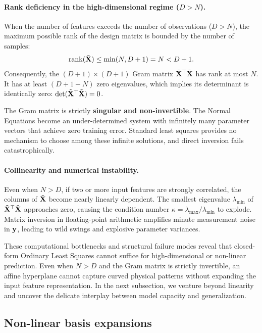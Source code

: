 \paragraph{Rank deficiency in the high-dimensional regime ($D > N$).}
When the number of features exceeds the number of observations ($D > N$), the maximum possible rank of the design matrix is bounded by the number of samples:
\begin{equation}
\operatorname{rank}(\tilde{\mathbf{X}}) \le \min(N, D+1) = N < D+1.
\label{eq:rank_deficiency}
\end{equation}
Consequently, the $(D+1) \times (D+1)$ Gram matrix $\tilde{\mathbf{X}}^\top \tilde{\mathbf{X}}$ has rank at most $N$. It has at least $(D+1 - N)$ zero eigenvalues, which implies its determinant is identically zero: $\det(\tilde{\mathbf{X}}^\top \tilde{\mathbf{X}}) = 0$. 

The Gram matrix is strictly \textbf{singular and non-invertible}. The Normal Equations become an under-determined system with infinitely many parameter vectors that achieve zero training error. Standard least squares provides no mechanism to choose among these infinite solutions, and direct inversion fails catastrophically.

\paragraph{Collinearity and numerical instability.}
Even when $N > D$, if two or more input features are strongly correlated, the columns of $\tilde{\mathbf{X}}$ become nearly linearly dependent. The smallest eigenvalue $\lambda_{\min}$ of $\tilde{\mathbf{X}}^\top \tilde{\mathbf{X}}$ approaches zero, causing the condition number $\kappa = \lambda_{\max}/\lambda_{\min}$ to explode. Matrix inversion in floating-point arithmetic amplifies minute measurement noise in $\mathbf{y}$, leading to wild swings and explosive parameter variances.

These computational bottlenecks and structural failure modes reveal that closed-form Ordinary Least Squares cannot suffice for high-dimensional or non-linear prediction. Even when $N > D$ and the Gram matrix is strictly invertible, an affine hyperplane cannot capture curved physical patterns without expanding the input feature representation. In the next subsection, we venture beyond linearity and uncover the delicate interplay between model capacity and generalization.

\subsection{Non-linear basis expansions}
\label{sec:beyond_linearity_and_capacity}
\label{sec:basis_expansion_polynomial}

